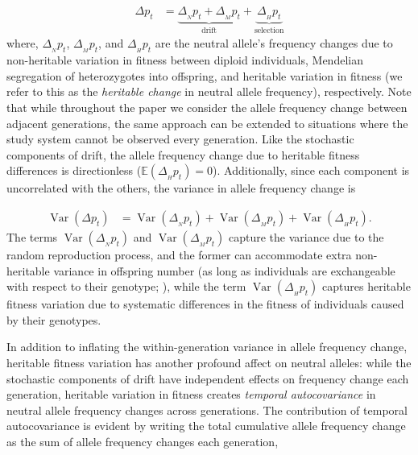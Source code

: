 \documentclass[11pt]{article}
\newcommand{\E}{\mathbb{E}}
\DeclareMathOperator{\var}{Var}
\begin{document}
\begin{align}
  \Delta p_t %
  &= \underbrace{\Delta_{_N} p_t + \Delta_{_M} p_t}_\text{drift} + \underbrace{\Delta_{_H} p_t}_\text{selection}
  \label{eq:delp-decomp}
\end{align}
%
where, $\Delta_{_N} p_t$, $\Delta_{_M} p_t$, and $\Delta_{_H} p_t$ are the
neutral allele's frequency changes due to non-heritable variation in fitness
between diploid individuals, Mendelian segregation of heterozygotes into
offspring, and heritable variation in fitness (we refer to this as the
\emph{heritable change} in neutral allele frequency), respectively. Note that 
  while throughout the paper we consider the allele frequency change between
  adjacent generations, the same approach can be extended to situations where
the study system cannot be observed every generation. Like the stochastic
components of drift, the allele frequency change due to heritable fitness
differences is directionless ($\E(\Delta_{_H} p_t) = 0$).
Additionally, since each component is uncorrelated with the others, the
variance in allele frequency change is

\begin{align}
  \var(\Delta p_t) &= \var(\Delta_{_N} p_t)  + \var(\Delta_{_M} p_t) + \var(\Delta_{_H} p_t).
  \label{eq:var-decomp-1}
\end{align}
%
The terms $\var(\Delta_{_N} p_t)$ and $\var(\Delta_{_M} p_t)$ capture the
variance due to the random reproduction process, and the former can accommodate
extra non-heritable variance in offspring number (as long as individuals are
exchangeable with respect to their genotype; \cite{Cannings1974-ps}), while the
term $\var(\Delta_{_H} p_t)$ captures heritable fitness variation due to
systematic differences in the fitness of individuals caused by their genotypes.

In addition to inflating the within-generation variance in allele frequency
change, heritable fitness variation has another profound affect on neutral
alleles: while the stochastic components of drift have independent effects on
frequency change each generation, heritable variation in fitness creates
\emph{temporal autocovariance} in neutral allele frequency changes across
generations. The contribution of temporal autocovariance is evident by writing
the total cumulative allele frequency change as the sum of allele frequency
changes each generation,
\end{document}
